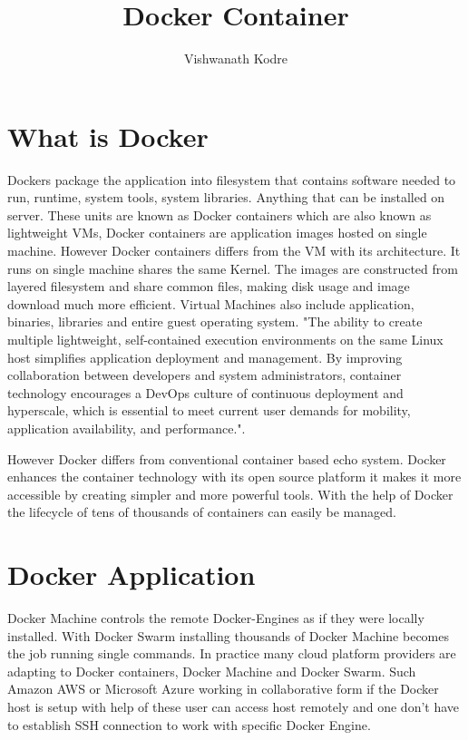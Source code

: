 \documentclass[9pt,twocolumn,twoside]{../../styles/osajnl}
\title{Docker Container}
\author[1,*]{Vishwanath Kodre}
\affil[1]{School of Informatics and Computing, Bloomington, IN 47408, U.S.A.}
\affil[*]{Corresponding authors: vkodre@iu.edu}
\begin{document}
\maketitle

\section{What is Docker}
Dockers package the application into filesystem that contains software needed to run, runtime, system tools, system libraries. Anything that can be installed on server. These units are known as Docker containers which are also known as lightweight VMs, Docker containers are application images hosted on single machine. However Docker containers differs from the VM with its architecture. It runs on single machine shares the same Kernel. The images are constructed from layered filesystem and share common files, making disk usage and image download much more efficient. Virtual Machines also include application, binaries, libraries and entire guest operating system. "The ability to create multiple lightweight, self-contained execution environments on the same Linux host simplifies application deployment and management. By improving collaboration between developers and system administrators, container technology encourages a DevOps culture of continuous deployment and hyperscale, which is essential to meet current user demands for mobility, application availability, and performance."\cite{DockerandtheLinuxcontainerecosystem}.

However Docker differs from conventional container based echo system. Docker enhances the container technology with its open source platform it makes it more accessible by creating simpler and more powerful tools. With the help of Docker the lifecycle of tens of thousands of containers can easily be managed.

\section{Docker Application}
Docker Machine controls the remote Docker-Engines as if they were locally installed. With Docker Swarm installing thousands of Docker Machine becomes the job running single commands. In practice many cloud platform providers are adapting to Docker containers, Docker Machine and Docker Swarm. Such Amazon AWS or Microsoft Azure working in collaborative form if the Docker host is setup with help of these user can access host remotely and one don't have to establish SSH connection to work with specific Docker Engine.
\end{document}
